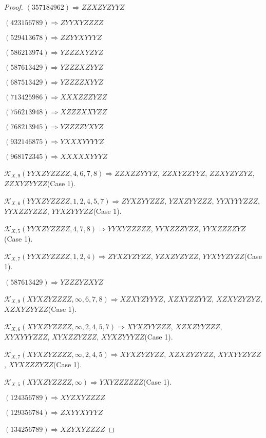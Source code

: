 \documentclass[12pt]{article}
\theoremstyle{plain}
\theoremstyle{definition}
\theoremstyle{remark}
\newcommand{\fancy}[1]{\mathcal{#1}}
\def\K{\fancy{K}}
\begin{document}
\begin{proof}
	$(3 5 7 1 8 4 9 6 2)\Rightarrow ZZXZYZYYZ$
	
	$(4 2 3 1 5 6 7 8 9)\Rightarrow ZYYXYZZZZ$
	
	$(5 2 9 4 1 3 6 7 8)\Rightarrow ZZYYXYYYZ$
	
	$(5 8 6 2 1 3 9 7 4)\Rightarrow YZZZXYZYZ$
	
	$(5 8 7 6 1 3 4 2 9)\Rightarrow YZZZXZYYZ$
	
	$(6 8 7 5 1 3 4 2 9)\Rightarrow YZZZZXYYZ$
	
	$(7 1 3 4 2 5 9 8 6)\Rightarrow XXXZZZYZZ$
	
	$(7 5 6 2 1 3 9 4 8)\Rightarrow XZZZXXYZZ$
	
	$(7 6 8 2 1 3 9 4 5)\Rightarrow YZZZZYXYZ$
	
	$(9 3 2 1 4 6 8 7 5)\Rightarrow YXXXYYYYZ$
	
	$(9 6 8 1 7 2 3 4 5)\Rightarrow XXXXXYYYZ$
	
	
	
	$\K_{X,9}(YYXZYZZZZ,4, 6, 7, 8)\Rightarrow $$ZZXZZYYYZ$, $ZZXYZZYYZ$, $ZZXYZYZYZ$, $ZZXYZYYZZ$(Case 1).
	
	$\K_{X,6}(YYXZYZZZZ,1, 2, 4, 5, 7)\Rightarrow $$ZYXZYYZZZ$, $YZXZYYZZZ$, $YYXYYYZZZ$, $YYXZZYZZZ$, $YYXZYYYZZ$(Case 1).
	
	$\K_{X,5}(YYXZYZZZZ,4, 7, 8)\Rightarrow $$YYXYZZZZZ$, $YYXZZZYZZ$, $YYXZZZZYZ$(Case 1).
	
	$\K_{X,7}(YYXZYZZZZ,1, 2, 4)\Rightarrow $$ZYXZYZYZZ$, $YZXZYZYZZ$, $YYXYYZYZZ$(Case 1).
	
	
	
	$(5 8 7 6 1 3 4 2 9)\Rightarrow YZZZYZXYZ$
	
	
	
	$\K_{X,9}(XYXZYZZZZ,\infty,6, 7, 8)\Rightarrow $$XZXYZYYYZ$, $XZXYZZYYZ$, $XZXYZYZYZ$, $XZXYZYYZZ$(Case 1).
	
	$\K_{X,6}(XYXZYZZZZ,\infty,2, 4, 5, 7)\Rightarrow $$XYXZYYZZZ$, $XZXZYYZZZ$, $XYXYYYZZZ$, $XYXZZYZZZ$, $XYXZYYYZZ$(Case 1).
	
	$\K_{X,7}(XYXZYZZZZ,\infty,2, 4, 5)\Rightarrow $$XYXZYZYZZ$, $XZXZYZYZZ$, $XYXYYZYZZ$, $XYXZZZYZZ$(Case 1).
	
	$\K_{X,5}(XYXZYZZZZ,\infty)\Rightarrow $$YXYZZZZZZ$(Case 1).
	
	
	
	$(1 2 4 3 5 6 7 8 9)\Rightarrow XYZXYZZZZ$
	
	$(1 2 9 3 5 6 7 8 4)\Rightarrow ZXYYXYYYZ$
	
	$(1 3 4 2 5 6 7 8 9)\Rightarrow XZYXYZZZZ$
	

\end{proof}
\end{document}
